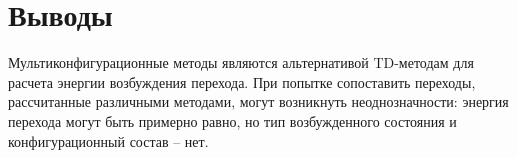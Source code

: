 \section{Выводы}
Мультиконфигурационные методы являются альтернативой TD-методам для расчета энергии возбуждения перехода. При попытке сопоставить переходы, рассчитанные различными методами, могут возникнуть неоднозначности: энергия перехода могут быть примерно равно, но тип возбужденного состояния и конфигурационный состав -- нет. 